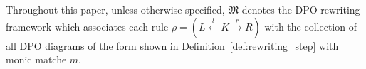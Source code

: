

% 

%  
Throughout this paper, unless otherwise specified, 
\(\mathfrak{M}\) denotes the DPO rewriting framework which associates each rule \( \rho \mathop{=} (L \overset{l}{\leftarrow} K \overset{r}{\rightarrow} R) \) with the collection of all DPO diagrams of the form shown in Definition~\ref{def:rewriting_step}
with monic matche $m$.